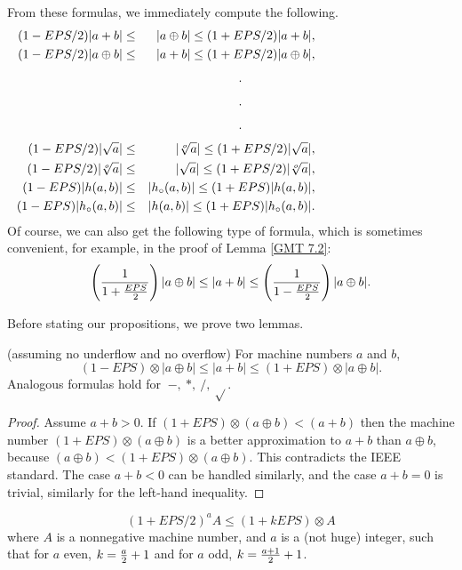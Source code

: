  
From these formulas, we immediately compute the following.
\begin{eqnarray*}
(1 - EPS/2) |a + b| &\leq& |a \oplus b| 
\leq (1 + EPS/2) |a+b|, \\ 
  (1 - EPS/2) |a \oplus b|& \leq& |a + b| 
\leq (1 + EPS/2) |a \oplus b|,\\
\noalign{\vskip4pt}
\noalign{\hfil .\hfil }  \noalign{\vskip4pt}
\noalign{\hfil .\hfil } \noalign{\vskip4pt}
\noalign{\hfil .\hfil } \noalign{\vskip4pt}
(1 - EPS/2) |\sqrt a| &\leq&  |\root o \of a| 
\leq (1 + EPS/2) |\sqrt a|, \\ (1 - EPS/2) |\root o \of a|&\leq&  |\sqrt a| 
\leq (1 + EPS/2) |\root o \of a|, \\  (1 - EPS) |h(a,b)| &\leq&  |h_\circ (a,b)| 
\leq (1 + EPS) |h(a,b)|, \\  (1 - EPS) |h_\circ (a,b)| &\leq& |h(a,b)| 
\leq (1 + EPS) |h_\circ (a,b)|.
\end{eqnarray*}
Of course, we can also get the following type of formula, which is sometimes convenient,
 for example, in the proof of Lemma \ref{GMT 7.2}:
$$\left({1 \over {1 + {EPS \over 2}}}\right) |a \oplus b| \leq |a + b| 
\leq \left({1 \over {1 - {EPS \over 2}}}\right) |a \oplus b|.$$

Before stating our propositions, we prove two lemmas.

\begin{lemma}\label{GMT 7.0} {\textrm (assuming no underflow and no overflow)}
For machine numbers $a$ and $b${\textrm ,}
$$(1 - EPS) \otimes |a \oplus b| \le |a + b| \le (1 + EPS) \otimes |a \oplus b|.$$
 Analogous formulas hold for $\ -,\ *,\ /,\ \sqrt{}$.
\end{lemma}

\begin{proof}{}
Assume $a+b > 0$.  
If $(1+EPS) \otimes (a \oplus b) < (a+b)$ then the machine number 
$(1+EPS) \otimes (a \oplus b)$ is a better approximation to $a+b$ than $a \oplus b$, because $(a \oplus b) 
< (1+EPS) \otimes (a \oplus b)$.  This contradicts the IEEE standard.  The case $a+b < 0$ can be handled similarly, and the
case $a+b = 0$ is trivial, similarly for the left-hand inequality.
\end{proof}

\begin{lemma}\label{GMT 7.1} $$(1 + EPS/2)^a A \le (1 + k EPS) \otimes A$$ 
 where $A$ is a nonnegative machine number{\textrm ,} and $a$ is a {\textrm (}\/not huge\/{\textrm )} integer{\textrm ,} such that
for $a$ even{\textrm ,} $k = {a \over 2} + 1$ and  for $a$ odd, $k = {a+1 \over 2} + 1$. 
\end{lemma}

